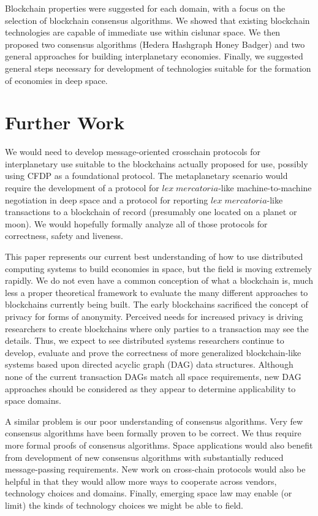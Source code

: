 \documentclass[]{aiaa-tc}%
\begin{document}
Blockchain properties were suggested for each domain, with a focus on the selection of blockchain consensus algorithms. We showed that existing blockchain technologies are capable of immediate use within cislunar space. We then proposed two consensus algorithms (Hedera Hashgraph Honey Badger) and two general approaches for building interplanetary economies. Finally, we suggested general steps necessary for development of technologies suitable for the formation of economies in deep space.


\section{Further Work}

We would need to develop message-oriented crosschain protocols for interplanetary use suitable to the blockchains actually proposed for use, possibly using CFDP as a foundational protocol. The metaplanetary scenario would require the development of  a protocol for $\mathit{lex\; mercatoria}$-like machine-to-machine negotiation in deep space and a protocol for reporting $\mathit{lex\; mercatoria}$-like transactions to a blockchain of record (presumably one located on a planet or moon). We would hopefully formally analyze all of those protocols for correctness, safety and liveness.

This paper represents our current best understanding of how to use distributed computing systems to build economies in space, but the field is moving extremely rapidly. We do not even have a common conception of what a blockchain is, much less a proper theoretical framework to evaluate the many different approaches to blockchains currently being built. The early blockchains sacrificed the concept of privacy for forms of anonymity. Perceived needs for increased privacy is driving researchers to create blockchains where only parties to a transaction may see the details. Thus, we expect to see distributed systems researchers continue to develop, evaluate and prove the correctness of more generalized blockchain-like systems based upon directed acyclic graph (DAG) data structures. Although none of the current transaction DAGs match all space requirements, new DAG approaches should be considered as they appear to determine applicability to space domains.

A similar problem is our poor understanding of consensus algorithms. Very few consensus algorithms have been formally proven to be correct. We thus require more formal proofs of consensus algorithms. Space applications would also benefit from development of new consensus algorithms with substantially reduced message-passing requirements. New work on cross-chain protocols would also be helpful in that they would allow more ways to cooperate across vendors, technology choices and domains. Finally, emerging space law may enable (or limit) the kinds of technology choices we might be able to field.
\end{document}
